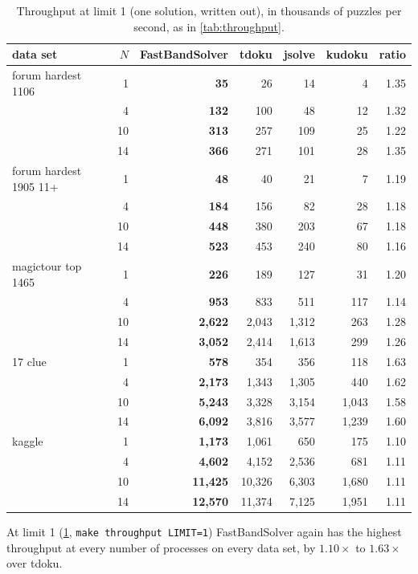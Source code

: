 \documentclass[11pt]{article}
\theoremstyle{definition}
\theoremstyle{plain}
\begin{document}
\begin{table}[t]
\centering
\caption{Throughput at limit 1 (one solution, written out), in thousands of puzzles per second, as in
\cref{tab:throughput}.}
\label{tab:throughput1}
\small
\begin{tabular}{lrrrrrr}
\toprule
data set & $N$ & FastBandSolver & tdoku & jsolve & kudoku & ratio \\
\midrule
forum hardest 1106 & 1 & \textbf{35} & 26 & 14 & 4 & 1.35 \\
 & 4 & \textbf{132} & 100 & 48 & 12 & 1.32 \\
 & 10 & \textbf{313} & 257 & 109 & 25 & 1.22 \\
 & 14 & \textbf{366} & 271 & 101 & 28 & 1.35 \\
\midrule
forum hardest 1905 11+ & 1 & \textbf{48} & 40 & 21 & 7 & 1.19 \\
 & 4 & \textbf{184} & 156 & 82 & 28 & 1.18 \\
 & 10 & \textbf{448} & 380 & 203 & 67 & 1.18 \\
 & 14 & \textbf{523} & 453 & 240 & 80 & 1.16 \\
\midrule
magictour top 1465 & 1 & \textbf{226} & 189 & 127 & 31 & 1.20 \\
 & 4 & \textbf{953} & 833 & 511 & 117 & 1.14 \\
 & 10 & \textbf{2{,}622} & 2{,}043 & 1{,}312 & 263 & 1.28 \\
 & 14 & \textbf{3{,}052} & 2{,}414 & 1{,}613 & 299 & 1.26 \\
\midrule
17 clue & 1 & \textbf{578} & 354 & 356 & 118 & 1.63 \\
 & 4 & \textbf{2{,}173} & 1{,}343 & 1{,}305 & 440 & 1.62 \\
 & 10 & \textbf{5{,}243} & 3{,}328 & 3{,}154 & 1{,}043 & 1.58 \\
 & 14 & \textbf{6{,}092} & 3{,}816 & 3{,}577 & 1{,}239 & 1.60 \\
\midrule
kaggle & 1 & \textbf{1{,}173} & 1{,}061 & 650 & 175 & 1.10 \\
 & 4 & \textbf{4{,}602} & 4{,}152 & 2{,}536 & 681 & 1.11 \\
 & 10 & \textbf{11{,}425} & 10{,}326 & 6{,}303 & 1{,}680 & 1.11 \\
 & 14 & \textbf{12{,}570} & 11{,}374 & 7{,}125 & 1{,}951 & 1.11 \\
\bottomrule
\end{tabular}
\end{table}

At limit 1 (\cref{tab:throughput1}, \texttt{make throughput LIMIT=1}) FastBandSolver again has the highest throughput at
every number of processes on every data set, by $1.10\times$ to $1.63\times$ over tdoku.
\end{document}
